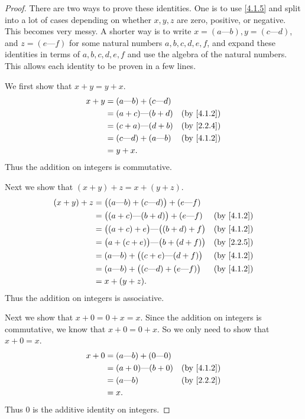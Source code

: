 \begin{proof}
  There are two ways to prove these identities.
  One is to use \cref{4.1.5} and split into a lot of cases depending on whether \(x, y, z\) are zero, positive, or negative.
  This becomes very messy.
  A shorter way is to write \(x = (a \text{---} b), y = (c \text{---} d)\), and \(z = (e \text{---} f)\) for some natural numbers \(a, b, c, d, e, f\), and expand these identities in terms of \(a, b, c, d, e, f\) and use the algebra of the natural numbers.
  This allows each identity to be proven in a few lines.

  We first show that \(x + y = y + x\).
  \begin{align*}
    x + y & = (a \text{---} b) + (c \text{---} d) &                          \\
          & = (a + c) \text{---} (b + d)          & \text{(by \cref{4.1.2})} \\
          & = (c + a) \text{---} (d + b)          & \text{(by \cref{2.2.4})} \\
          & = (c \text{---} d) + (a \text{---} b) & \text{(by \cref{4.1.2})} \\
          & = y + x.
  \end{align*}
  Thus the addition on integers is commutative.

  Next we show that \((x + y) + z = x + (y + z)\).
  \begin{align*}
    (x + y) + z & = \big((a \text{---} b) + (c \text{---} d)\big) + (e \text{---} f)                            \\
                & = \big((a + c) \text{---} (b + d)\big) + (e \text{---} f)          & \text{(by \cref{4.1.2})} \\
                & = \big((a + c) + e\big) \text{---} \big((b + d) + f\big)           & \text{(by \cref{4.1.2})} \\
                & = \big(a + (c + e)\big) \text{---} \big(b + (d + f)\big)           & \text{(by \cref{2.2.5})} \\
                & = (a \text{---} b) + \big((c + e) \text{---} (d + f)\big)          & \text{(by \cref{4.1.2})} \\
                & = (a \text{---} b) + \big((c \text{---} d) + (e \text{---} f)\big) & \text{(by \cref{4.1.2})} \\
                & = x + (y + z).
  \end{align*}
  Thus the addition on integers is associative.

  Next we show that \(x + 0 = 0 + x = x\).
  Since the addition on integers is commutative, we know that \(x + 0 = 0 + x\).
  So we only need to show that \(x + 0 = x\).
  \begin{align*}
    x + 0 & = (a \text{---} b) + (0 \text{---} 0)                            \\
          & = (a + 0) \text{---} (b + 0)          & \text{(by \cref{4.1.2})} \\
          & = (a \text{---} b)                    & \text{(by \cref{2.2.2})} \\
          & = x.
  \end{align*}
  Thus \(0\) is the additive identity on integers.


\end{proof}
